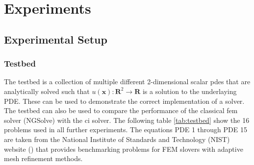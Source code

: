 \documentclass[./\jobname.tex]{subfiles}
\begin{document}
\chapter{Experiments}

\section{Experimental Setup}

\subsection{Testbed}
The testbed is a collection of multiple different 2-dimensional scalar \gls{pde}s that are analytically solved such that $u(\mathbf{x}): \mathbf{R}^2 \rightarrow \mathbf{R}$ is a solution to the underlaying PDE. These can be used to demonstrate the correct implementation of a solver. The testbed can also be used to compare the performance of the classical \gls{fem} solver (NGSolve) with the \gls{ci} solver. The following table \ref{tab:testbed} show the 16 problems used in all further experiments. The equations PDE 1 through PDE 15 are taken from the National Institute of Standards and Technology (NIST) website (\cite{mitchell_nist_2018}) that provides benchmarking problems for FEM slovers with adaptive mesh refinement methods.
\end{document}
